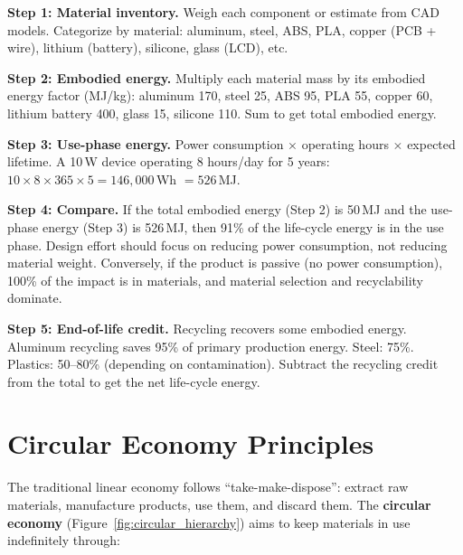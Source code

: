 \documentclass[11pt,letterpaper,twoside,openany]{book}
\begin{document}
\textbf{Step 1: Material inventory.} Weigh each component or estimate from CAD models. Categorize by material: aluminum, steel, ABS, PLA, copper (PCB + wire), lithium (battery), silicone, glass (LCD), etc.

\textbf{Step 2: Embodied energy.} Multiply each material mass by its embodied energy factor (MJ/kg): aluminum 170, steel 25, ABS 95, PLA 55, copper 60, lithium battery 400, glass 15, silicone 110. Sum to get total embodied energy.

\textbf{Step 3: Use-phase energy.} Power consumption $\times$ operating hours $\times$ expected lifetime. A 10\,W device operating 8 hours/day for 5 years: $10 \times 8 \times 365 \times 5 = 146{,}000$\,Wh $= 526$\,MJ.

\textbf{Step 4: Compare.} If the total embodied energy (Step 2) is 50\,MJ and the use-phase energy (Step 3) is 526\,MJ, then 91\% of the life-cycle energy is in the use phase. Design effort should focus on reducing power consumption, not reducing material weight. Conversely, if the product is passive (no power consumption), 100\% of the impact is in materials, and material selection and recyclability dominate.

\textbf{Step 5: End-of-life credit.} Recycling recovers some embodied energy. Aluminum recycling saves 95\% of primary production energy. Steel: 75\%. Plastics: 50--80\% (depending on contamination). Subtract the recycling credit from the total to get the net life-cycle energy.

\section{Circular Economy Principles}
The traditional linear economy follows ``take-make-dispose'': extract raw materials, manufacture products, use them, and discard them. The \textbf{circular economy} (Figure~\ref{fig:circular_hierarchy}) aims to keep materials in use indefinitely through:
\end{document}
